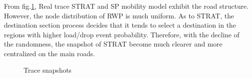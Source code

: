 From fig.\ref{figure_trace_snapshots}, Real trace STRAT and SP mobility model exhibit the road structure. However, the node distribution of RWP is much uniform.
As to STRAT, the destination section process decides that it tends to select a destination in the regions with higher load/drop event probability.
Therefore, with the decline of the randomness, the snapshot of STRAT become much clearer and more centralized on the main roads.
\begin{figure}[!h]
\centering
{}
\vspace{0.in}
\hspace{0.0in}
\vspace{0.in}
\hspace{0.0in}
\vspace{0.in}
\hspace{0.0in}
\caption{Trace snapshots}\label{figure_trace_snapshots}
\end{figure}



